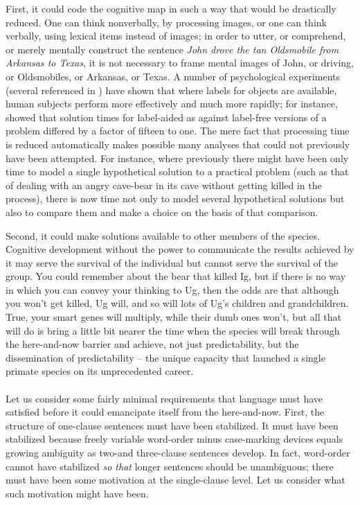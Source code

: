 First, it could code the cognitive map in such a way that  would be drastically reduced. One can think nonverbally, by processing images, or one can think verbally, using lexical items instead of images; in order to utter, or comprehend, or merely mentally construct the sentence \textit{John drove the tan Oldsmobile from Arkansas to Texas}, it is not necessary to frame mental images of John, or driving, or Oldsmobiles, or Arkansas, or Texas. A number of psychological experi\-ments (several referenced in \citealt{Hamilton1974}) have shown that where labels for objects are available, human subjects perform more effec\-tively and much more rapidly; for instance, \citet{GlucksbergEtAl1966} showed that solution times for label-aided as against label-free versions of a problem differed by a factor of fifteen to one. The mere fact that processing time is reduced automatically makes possible many analyses that could not previously have been attempted. For instance, where previously there might have been only time to model a single hypothetical solution to a practical problem (such as that of dealing with an angry cave-bear in its cave without getting killed in the process), there is now time not only to model several hypothetical solutions but also to compare them and make a choice on the basis of that comparison.

Second, it could make solutions available to other members of the species. Cognitive development without the power to communicate the results achieved by it may serve the survival of the individual but cannot serve the survival of the group. You could remember about the bear that killed Ig, but if there is no way in which you can convey your thinking to Ug, then the odds are that although you won't get killed, Ug will, and so will lots of Ug's children and grandchildren. True, your smart genes will multiply, while their dumb ones won't, but all that will do is bring a little bit nearer the time when the species will break through the here-and-now barrier and achieve, not just
predictability, but the dissemination of predictability -- the unique capacity that launched a single primate species on its unprecedented career.\\\\

Let us consider some fairly minimal requirements that language  must have satisfied before it could emancipate itself from the here-and-now. First, the structure of one-clause sentences must have been stabilized. It must have been stabilized because freely variable word-order minus case-marking devices equals growing ambiguity as two-and three-clause sentences develop. In fact, word-order cannot have stabilized \textit{so that} longer sentences should be unambiguous; there must have been some motivation at the single-clause level. Let us consider what such motivation might have been.

